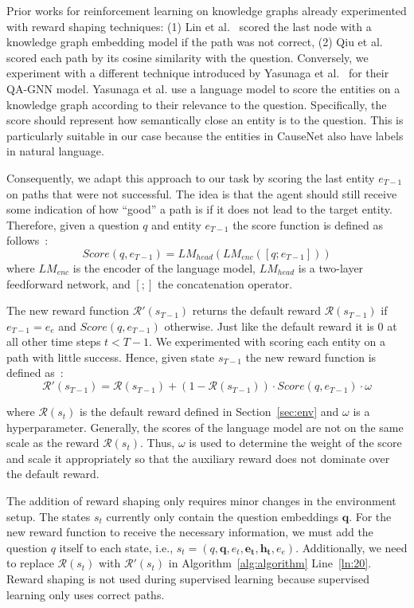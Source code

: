 Prior works for reinforcement learning on knowledge graphs already experimented with reward shaping techniques: (1) Lin et al.~\cite{Lin2020RewardShaping} scored 
the last node with a knowledge graph embedding model if the path was not correct, (2) Qiu et al.~\cite{Qiu2020Stepwise} scored each 
path by its cosine similarity with the question. Conversely, we experiment with a 
different technique introduced by Yasunaga et al.~\cite{Yasunaga2021QAGNN} for their QA-GNN model.
Yasunaga et al. use a language model to score the entities on a knowledge graph according to their relevance 
to the question. Specifically, the score should represent how semantically close an entity is to the question. This is particularly suitable in our case because the entities in CauseNet also 
have labels in natural language.

Consequently, we adapt this approach to our task by scoring the last entity $e_{T-1}$ on paths that were not successful.
The idea is that the agent should still receive some indication of how ``good'' a path is if it does 
not lead to the target entity. 
Therefore, given a question $q$ and entity $e_{T-1}$ the score function is defined 
as follows~\cite{Yasunaga2021QAGNN}:
\begin{equation}
  Score(q, e_{T-1}) = LM_{head}(LM_{enc}([q;e_{T-1}]))
\end{equation}
where $LM_{enc}$ is the encoder of the language model, $LM_{head}$ is a two-layer feedforward network, and 
$[;]$ the concatenation operator.


The new reward function $\mathcal{R}'(s_{T-1})$ returns the default reward $\mathcal{R}(s_{T-1})$ if $e_{T-1}=e_e$
and $Score(q, e_{T-1})$ otherwise. Just like the default reward it is $0$ at all other time steps $t < T-1$.
We experimented with scoring each entity on a path with little success.
Hence, given state $s_{T-1}$ the new reward function is defined as~\cite{Lin2020RewardShaping}:
\begin{equation}
  \mathcal{R}'(s_{T-1}) = \mathcal{R}(s_{T-1}) + (1 -  \mathcal{R}(s_{T-1})) \cdot Score(q, e_{T-1}) \cdot \omega  
\end{equation}

where $\mathcal{R}(s_t)$ is the default reward defined in Section~\ref{sec:env} and 
$\omega$ is a hyperparameter. Generally, the scores of the language model are not on the same scale 
as the reward $\mathcal{R}(s_t)$. Thus, $\omega$ is used to determine the weight of the score 
and scale it appropriately so that the auxiliary reward does not dominate over the default 
reward.

The addition of reward shaping only requires minor changes in the environment setup.
The states $s_t$ currently only contain the question embeddings $\mathbf{q}$. 
For the new reward function to receive the necessary information, we must 
add the question $q$ itself to each state, i.e., $s_t = (q, \mathbf{q}, e_t, \mathbf{e_t}, \mathbf{h_t}, e_e)$.
Additionally, we need to replace $\mathcal{R}(s_t)$ with $\mathcal{R}'(s_t)$ in Algorithm~\ref{alg:algorithm} Line~\ref{ln:20}.
Reward shaping is not used during supervised learning because supervised learning 
only uses correct paths.